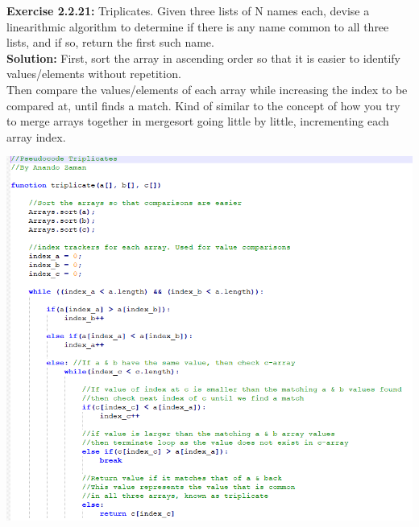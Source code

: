 \documentclass[11pt,fleqn]{article}
\begin{document}
\textbf{Exercise 2.2.21:} Triplicates. Given three lists of N names each, devise a linearithmic algorithm
to determine if there is any name common to all three lists, and if so, return the first
such name.\\

\textbf{Solution:}
First, sort the array in ascending order so that it is easier to identify values/elements without repetition.\\

Then compare the values/elements of each array while increasing the index to be compared at, until finds a match. Kind of similar to the concept of how you try to merge arrays together in mergesort going little by little, incrementing each array index.

\begin{center}
	\includegraphics[scale = 0.8]{2.2.21.png}
	\end{center}
\end{document}
